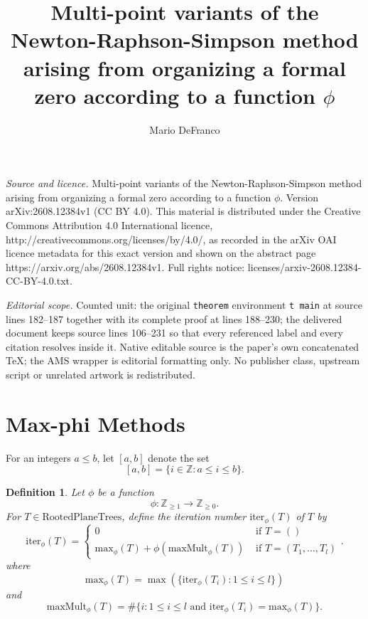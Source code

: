 \documentclass[10pt,a4paper]{amsart}
\newtheorem{definition}{Definition}
\newcommand{\iter}{\mathrm{iter}_\phi}
\newcommand{\maxphi}{\mathrm{max}_\phi}
\newcommand{\maxMult}{\mathrm{maxMult}_\phi}
\begin{document}
\title[Multi-point variants of the Newton-Raphson-Simpson method ar]{Multi-point variants of the Newton-Raphson-Simpson method arising from organizing a formal zero according to a function $\phi$}
\author{Mario DeFranco}
\date{}
\maketitle
\noindent\emph{Source and licence.} Multi-point variants of the Newton-Raphson-Simpson method arising from organizing a formal zero according to a function $\phi$. Version arXiv:2608.12384v1 (CC BY 4.0). This material is distributed under the Creative Commons Attribution 4.0 International licence, http://creativecommons.org/licenses/by/4.0/, as recorded in the arXiv OAI licence metadata for this exact version and shown on the abstract page https://arxiv.org/abs/2608.12384v1. Full rights notice: licenses/arxiv-2608.12384-CC-BY-4.0.txt.\par\smallskip
\noindent\textit{Editorial scope.} Counted unit: the original \texttt{theorem} environment \texttt{t main} at source lines 182--187 together with its complete proof at lines 188--230; the delivered document keeps source lines 106--231 so that every referenced label and every citation resolves inside it. Native editable source is the paper's own concatenated TeX; the AMS wrapper is editorial formatting only. No publisher class, upstream script or unrelated artwork is redistributed.
\section{Max-phi Methods}

For an integers $a\leq b$, let $[a,b]$ denote the set 
\[
[a,b]=\{ i \in \mathbb{Z} \colon a\leq i \leq b\}.
\]

\begin{definition} \label{d iterphi}
 Let $\phi$ be a function 
\[
\phi \colon \mathbb{Z}_{\geq 1} \rightarrow  \mathbb{Z}_{\geq 0}. 
\]
For $T \in \mathrm{RootedPlaneTrees}$, define the iteration number $\iter(T)$ of $T$ by  
\[
\iter(T) = \begin{cases} 0 &\text{ if } T=()\\ 
   \maxphi(T)+ \phi(\maxMult(T)) &\text{ if } T= (T_1, \ldots, T_l)
\end{cases}.
\]
where
\[
\maxphi(T) = \max(\{\iter(T_i) \colon 1 \leq i \leq l \})
\]
and 
\[
\maxMult(T) = \# \{i \colon  1 \leq i \leq l  \text{ and } \iter(T_i) = \maxphi(T)\}.
\]
\end{definition} 
\end{document}
